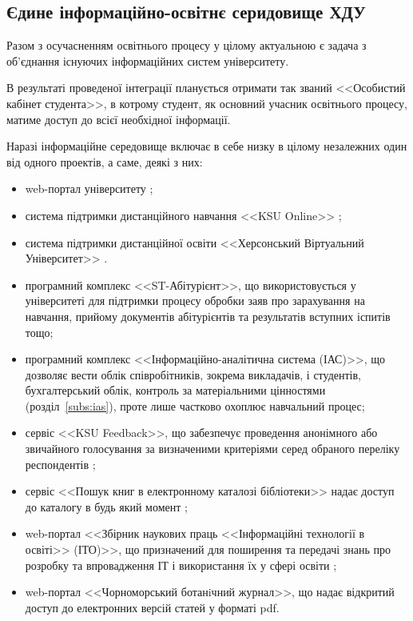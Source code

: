 \subsection{Єдине інформаційно-освітнє серидовище ХДУ}

Разом з осучасненням освітнього процесу у цілому актуальною є задача з об'єднання існуючих інформаційних систем університету.

В результаті проведеної інтеграції планується отримати так званий <<Особистий кабінет студента>>, в котрому студент, як основний учасник освітнього процесу, матиме доступ до всієї необхідної інформації. 

Наразі інформаційне середовище включає в себе низку в цілому незалежних один від одного проектів, а саме, деякі з них:

\begin{itemize}
	\item web-портал університету \cite{KspuEdu};
	\item система підтримки дистанційного навчання <<KSU Online>> \cite{KsuOnline};
	\item система підтримки дистанційної освіти <<Херсонський Віртуальний Університет>> \cite{KsuDis}.
	\item програмний комплекс <<ST-Абітурієнт>>, що використовується у університеті для підтримки процесу обробки заяв про зарахування на навчання, прийому документів абітурієнтів та результатів вступних іспитів тощо;
	\item програмний комплекс <<Інформаційно-аналітична система (ІАС)>>, що дозволяє вести облік співробітників, зокрема викладачів, і студентів, бухгалтерський облік, контроль за матеріальними цінностями (розділ~\ref{subs:ias}), проте лише частково охоплює навчальний процес;
	\item сервіс <<KSU Feedback>>, що забезпечує проведення анонімного або звичайного голосування за визначеними критеріями серед обраного переліку респондентів \cite{KsuFeedback};
	\item сервіс  <<Пошук книг в електронному каталозі бібліотеки>> надає доступ до каталогу в будь який момент \cite{eLibrary};
	\item web-портал <<Збірник наукових праць <<Інформаційні технології в освіті>> (ІТО)>>, що призначений для поширення та передачі знань про розробку та впровадження ІТ і використання їх у сфері освіти \cite{ITO};
	\item web-портал <<Чорноморський ботанiчний журнал>>, що надає відкритий доступ до електронних версій статей у форматі pdf.
\end{itemize}

